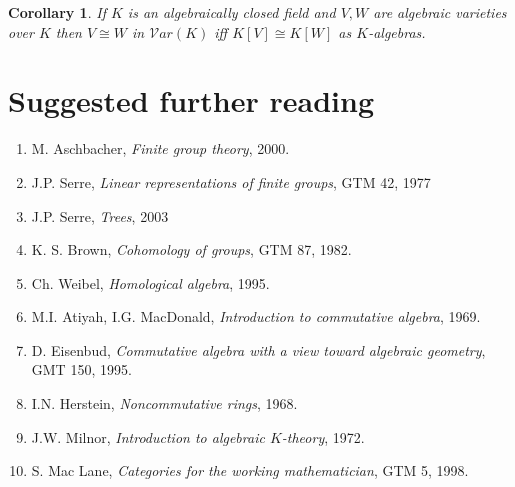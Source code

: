 \documentclass[12pt, letterpaper, oneside]{article}
\theoremstyle{plain}
\newtheorem{corollary}[theorem]{Corollary}
\theoremstyle{definition}
\newcommand{\benu}{\begin{enumerate}}
\newcommand{\eenu}{\end{enumerate}}
\newcommand{\vs}{\vskip 5mm}
\begin{document}
\vs\vs

\begin{corollary}
If $K$ is an algebraically closed field and $V, W$ are algebraic varieties over $K$ then 
$V\cong W$ in $\mathcal{V}ar(K)$ iff $K[V]\cong K[W]$ as $K$-algebras. 
\end{corollary}






\newpage
\section{Suggested further reading}
\label{SEC_SUGGREADING}



\vs\vs\vs


\benu
\item M. Aschbacher, \emph{Finite group theory}, 2000. 
\item J.P. Serre, \emph{Linear representations of finite groups}, GTM  42, 1977
\item J.P. Serre, \emph{Trees}, 2003
\item K. S. Brown, \emph{Cohomology of groups}, GTM 87, 1982.
\item Ch. Weibel, \emph{Homological algebra}, 1995.
\item M.I. Atiyah, I.G. MacDonald,  \emph{Introduction to commutative algebra}, 1969.
\item D. Eisenbud,  \emph{Commutative algebra with a view toward algebraic geometry}, 
GMT 150, 1995.
\item I.N. Herstein, \emph{Noncommutative rings}, 1968.
\item J.W. Milnor, \emph{Introduction to algebraic $K$-theory}, 1972.
\item S. Mac Lane, \emph{Categories for the working mathematician}, GTM 5, 1998. 
\eenu




\end{document}
